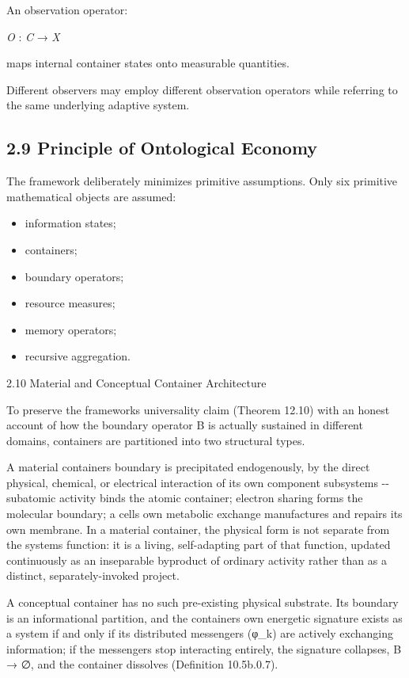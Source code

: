 \documentclass[
]{article}
\begin{document}
An observation operator:

\emph{O} : \emph{C} → \emph{X}

maps internal container states onto measurable quantities.

Different observers may employ different observation operators while
referring to the same underlying adaptive system.

\hypertarget{principle-of-ontological-economy}{%
\subsection{2.9 Principle of Ontological
Economy}\label{principle-of-ontological-economy}}

The framework deliberately minimizes primitive assumptions. Only six
primitive mathematical objects are assumed:

\begin{itemize}
\item
  information states;
\item
  containers;
\item
  boundary operators;
\item
  resource measures;
\item
  memory operators;
\item
  recursive aggregation.
\end{itemize}

2.10 Material and Conceptual Container Architecture

To preserve the frameworks universality claim (Theorem 12.10) with an
honest account of how the boundary operator B is actually sustained in
different domains, containers are partitioned into two structural types.

A material containers boundary is precipitated endogenously, by the
direct physical, chemical, or electrical interaction of its own
component subsystems -\/- subatomic activity binds the atomic container;
electron sharing forms the molecular boundary; a cells own metabolic
exchange manufactures and repairs its own membrane. In a material
container, the physical form is not separate from the systems function:
it is a living, self-adapting part of that function, updated
continuously as an inseparable byproduct of ordinary activity rather
than as a distinct, separately-invoked project.

A conceptual container has no such pre-existing physical substrate. Its
boundary is an informational partition, and the containers own energetic
signature exists as a system if and only if its distributed messengers
(φ\_k) are actively exchanging information; if the messengers stop
interacting entirely, the signature collapses, B → ∅, and the container
dissolves (Definition 10.5b.0.7).
\end{document}
